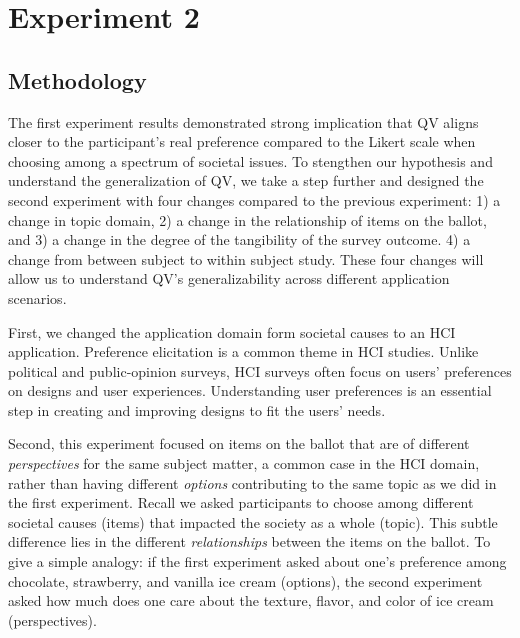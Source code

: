 \section{Experiment 2}
\subsection{Methodology} \label{method-2}


The first experiment results demonstrated strong implication that QV aligns closer to the participant's real preference compared to the Likert scale when choosing among a spectrum of societal issues. To stengthen our hypothesis and understand the generalization of QV, we take a step further and designed the second experiment with four changes compared to the previous experiment: 1) a change in topic domain, 2) a change in the relationship of items on the ballot, and 3) a change in the degree of the tangibility of the survey outcome. 4) a change from between subject to within subject study. These four changes will allow us to understand QV's generalizability across different application scenarios. 

First, we changed the application domain form societal causes to an HCI application. Preference elicitation is a common theme in HCI studies. Unlike political and public-opinion surveys, HCI surveys often focus on users' preferences on designs and user experiences. Understanding user preferences is an essential step in creating and improving designs to fit the users' needs.

Second, this experiment focused on items on the ballot that are of different \textit{perspectives} for the same subject matter, a common case in the HCI domain, rather than having different \textit{options} contributing to the same topic as we did in the first experiment. Recall we asked participants to choose among different societal causes (items) that impacted the society as a whole (topic). This subtle difference lies in the different \textit{relationships} between the items on the ballot. To give a simple analogy: if the first experiment asked about one's preference among chocolate, strawberry, and vanilla ice cream (options), the second experiment asked how much does one care about the texture, flavor, and color of ice cream (perspectives). 

